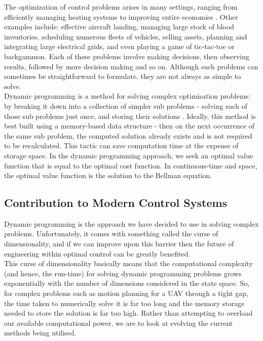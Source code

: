 \documentclass[11pt,draftd]{article}
\begin{document}
The optimization of control problems arises in many settings, ranging from efficiently managing heating systems to improving entire economies \cite{powell}. Other examples include: effective aircraft landing, managing large stock of blood inventories, scheduling numerous fleets of vehicles, selling assets, planning and integrating large electrical grids, and even playing a game of tic-tac-toe or backgammon. Each of these problems involve making decisions, then observing results, followed by more decision making and so on. Although such problems can sometimes be straightforward to formulate, they are not always as simple to solve. \\

Dynamic programming is a method for solving complex optimisation problems: by breaking it down into a collection of simpler sub problems - solving each of those sub problems just once, and storing their solutions \cite{wikiDyn}. Ideally, this method is best built using a memory-based data structure - then on the next occurrence of the same sub problem, the computed solution already exists and is not required to be recalculated. This tactic can save computation time at the expense of storage space. In the dynamic programming approach, we seek an optimal value function that is equal to the optimal cost function. In continuous-time and space, the optimal value function is the solution to the Bellman equation. \\

\subsection{Contribution to Modern Control Systems}
Dynamic programming is the approach we have decided to use in solving complex problems. Unfortunately, it comes with something called the curse of dimensionality, and if we can improve upon this barrier then the future of engineering within optimal control can be greatly benefited. \\

This curse of dimensionality basically means that the computational complexity (and hence, the run-time) for solving dynamic programming problems grows exponentially with the number of dimensions considered in the state space. So, for complex problems such as motion planning for a UAV through a tight gap, the time taken to numerically solve it is far too long and the memory storage needed to store the solution is far too high. Rather than attempting to overload our available computational power, we are to look at evolving the current methods being utilised. \\
\end{document}
